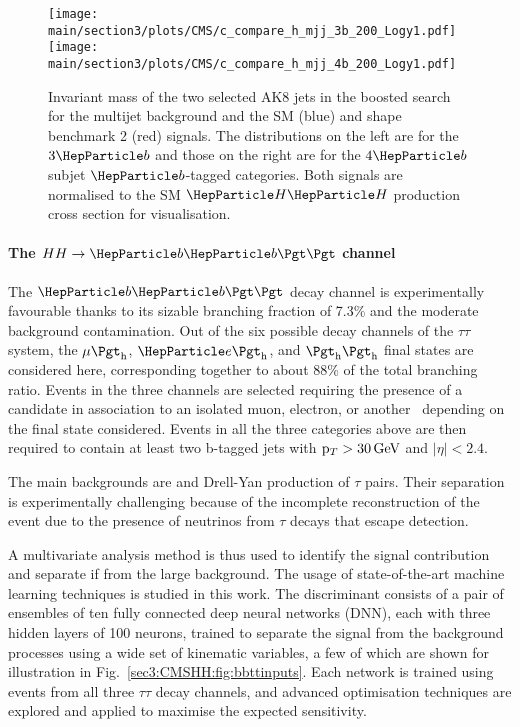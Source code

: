 \begin{figure}[!htb]
\centering 
    \texttt{[image: \\main/section3/plots/CMS/c\_compare\_h\_mjj\_3b\_200\_Logy1.pdf]}
    \texttt{[image: \\main/section3/plots/CMS/c\_compare\_h\_mjj\_4b\_200\_Logy1.pdf]}
\caption{Invariant mass of the two selected AK8 jets in the boosted \bbbb \HH search for the multijet background and the SM (blue) and shape benchmark 2 (red) signals.
    The distributions on the left are for the $3\PQb$ and those on the right are for the $4\PQb$ subjet $\PQb$-tagged categories.
    Both signals are normalised to the SM $\PH\PH$ production cross section for visualisation.} 
\label{sec3:CMSHH:fig:bbbb_boosted} 
\end{figure}



\paragraph{The $HH \rightarrow \bbtt$ channel}

The $\bbtt$ decay channel is experimentally favourable thanks to its sizable branching fraction of 7.3\% and the moderate background contamination.
Out of the six possible decay channels of the $\tau\tau$ system, the $\mu\tauh$, $\Pe\tauh$, and $\tauh\tauh$ final states are considered here, corresponding together to about 88\% of the total branching ratio.
Events in the three channels are selected requiring the presence of a \tauh candidate in association to an isolated muon, electron, or another \tauh\ depending on the final state considered.
Events in all the three categories above are then required to contain at least two b-tagged jets with $\mathrm{p}_{T} > 30\,\text{Ge\hspace{-.08em}V}$ and $|\eta| < 2.4$. 

The main backgrounds are \ttbar and Drell-Yan production of $\tau$ pairs.
Their separation is experimentally challenging because of the incomplete reconstruction of the event due to the presence of neutrinos from $\tau$ decays that escape detection.

A multivariate analysis method is thus used to identify the signal contribution and separate if from the large background.
The usage of state-of-the-art machine learning techniques is studied in this work.
The discriminant consists of a pair of ensembles of ten fully connected deep neural networks (DNN), each with three hidden layers of 100 neurons, trained to separate the \HH signal from the background processes using a wide set of kinematic variables, a few of which are shown for illustration in Fig.~\ref{sec3:CMSHH:fig:bbttinputs}.
Each network is trained using events from all three $\tau\tau$ decay channels, and advanced optimisation techniques are explored and applied to maximise the expected sensitivity.

